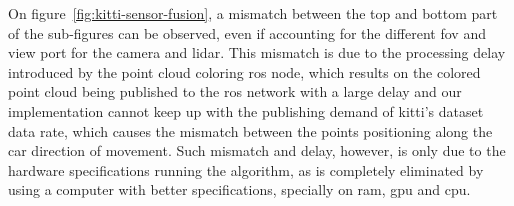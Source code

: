 On figure~\ref{fig:kitti-sensor-fusion}, a mismatch between the top and bottom part of the sub-figures can be observed, even if accounting for the different \ac{fov} and view port for the camera and \ac{lidar}. This mismatch is due to the processing delay introduced by the point cloud coloring \ac{ros} node, which results on the colored point cloud being published to the \ac{ros} network with a large delay and our implementation cannot keep up with the publishing demand of \ac{kitti}'s dataset data rate, which causes the mismatch between the points positioning along the car direction of movement. Such mismatch and delay, however, is only due to the hardware  specifications running the algorithm, as is completely eliminated by using a computer with better specifications, specially on \ac{ram}, \ac{gpu} and \ac{cpu}.

